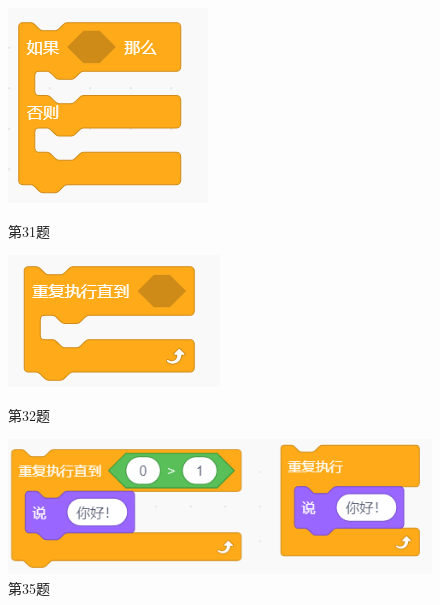 \documentclass[10pt, a4paper]{article}
\begin{document}
\begin{enumerate}
        \begin{figure}[htbp]
            \centering
            \begin{minipage}[t]{.18\textwidth}
                \centering
                \includegraphics[width=.7\textwidth]{31.png}
                \caption*{第31题}
            \end{minipage}
            \begin{minipage}[t]{.18\textwidth}
                \centering
                \includegraphics[width=\textwidth]{32.png}
                \caption*{第32题}
            \end{minipage}
            \begin{minipage}[t]{.33\textwidth}
                \centering
                \includegraphics[width=\textwidth]{35.png}
                \caption*{第35题}
            \end{minipage}
        \end{figure}
        

\end{enumerate}
\end{document}
